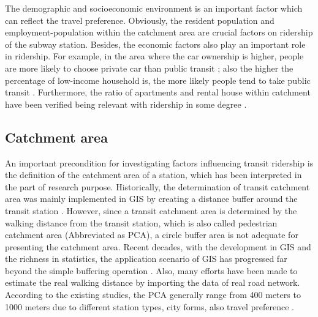 The demographic and socioeconomic environment is an important factor which can reflect the travel preference. Obviously, the resident population and employment-population within the catchment area are crucial factors on ridership of the subway station. Besides, the economic factors also play an important role in ridership. For example, in the area where the car ownership is higher, people are more likely to choose private car than public transit \cite{chiou2015factors,zhao2005transit}; also the higher the percentage of low-income household is, the more likely people tend to take public transit \cite{thompson2012really}. Furthermore, the ratio of apartments and rental house within catchment have been verified being relevant with ridership in some degree \cite{jun2015land}.

\subsection{Catchment area}
An important precondition for investigating factors influencing transit ridership is the definition of the catchment area of a station, which has been interpreted in the part of research purpose. Historically, the determination of transit catchment area was mainly implemented in GIS by creating a distance buffer around the transit station \cite{o1992analysis,hsiao1997use,ayvalik2002heuristic,peng1997simultaneous}. However, since a transit catchment area is determined by the walking distance from the transit station, which is also called pedestrian catchment area (Abbreviated as PCA), a circle buffer area is not adequate for presenting the catchment area. Recent decades, with the development in GIS and the richness in statistics, the application scenario of GIS has progressed far beyond the simple buffering operation \cite{biba2010new,wu2003ptal,jiang2012walk}. Also, many efforts have been made to estimate the real walking distance by importing the data of real road network. According to the existing studies, the PCA generally range from 400 meters to 1000 meters due to different station types, city forms, also travel preference \cite{alshalalfah2007case,guerra2012half,keijer2000people,murray1998public,o1996walking,zhao2003forecasting}.

